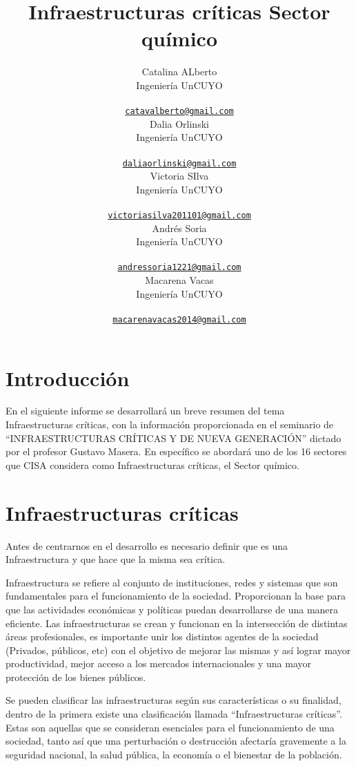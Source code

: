 \documentclass{article}
\title{Infraestructuras críticas Sector químico}
\author{
    Catalina ALberto
   \\
    Ingeniería UnCUYO \\
   \\
  \texttt{\href{mailto:catavalberto@gmail.com}{\nolinkurl{catavalberto@gmail.com}}} \\
   \And
    Dalia Orlinski
   \\
    Ingeniería UnCUYO \\
   \\
  \texttt{\href{mailto:daliaorlinski@gmail.com}{\nolinkurl{daliaorlinski@gmail.com}}} \\
   \And
    Victoria SIlva
   \\
    Ingeniería UnCUYO \\
   \\
  \texttt{\href{mailto:victoriasilva201101@gmail.com}{\nolinkurl{victoriasilva201101@gmail.com}}} \\
   \And
    Andrés Soria
   \\
    Ingeniería UnCUYO \\
   \\
  \texttt{\href{mailto:andressoria1221@gmail.com}{\nolinkurl{andressoria1221@gmail.com}}} \\
   \And
    Macarena Vacas
   \\
    Ingeniería UnCUYO \\
   \\
  \texttt{\href{mailto:macarenavacas2014@gmail.com}{\nolinkurl{macarenavacas2014@gmail.com}}} \\
  }
\begin{document}
\maketitle


\begin{abstract}

\end{abstract}


\hypertarget{introducciuxf3n}{%
\section{Introducción}\label{introducciuxf3n}}

\label{sec:headings}

En el siguiente informe se desarrollará un breve resumen del tema
Infraestructuras críticas, con la información proporcionada en el
seminario de ``INFRAESTRUCTURAS CRÍTICAS Y DE NUEVA GENERACIÓN'' dictado
por el profesor Gustavo Masera. En específico se abordará uno de los 16
sectores que CISA considera como Infraestructuras críticas, el Sector
químico.

\hypertarget{infraestructuras-cruxedticas}{%
\section{Infraestructuras críticas}\label{infraestructuras-cruxedticas}}

\label{sec:others}

Antes de centrarnos en el desarrollo es necesario definir que es una
Infraestructura y que hace que la misma sea crítica.

Infraestructura se refiere al conjunto de instituciones, redes y
sistemas que son fundamentales para el funcionamiento de la sociedad.
Proporcionan la base para que las actividades económicas y políticas
puedan desarrollarse de una manera eficiente. Las infraestructuras se
crean y funcionan en la intersección de distintas áreas profesionales,
es importante unir los distintos agentes de la sociedad (Privados,
públicos, etc) con el objetivo de mejorar las mismas y así lograr mayor
productividad, mejor acceso a los mercados internacionales y una mayor
protección de los bienes públicos.

Se pueden clasificar las infraestructuras según sus características o su
finalidad, dentro de la primera existe una clasificación llamada
``Infraestructuras críticas''. Estas son aquellas que se consideran
esenciales para el funcionamiento de una sociedad, tanto así que una
perturbación o destrucción afectaría gravemente a la seguridad nacional,
la salud pública, la economía o el bienestar de la población.
\end{document}
